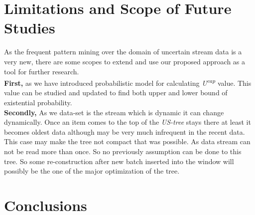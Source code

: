 \section{Limitations and Scope of Future Studies}
As the frequent pattern mining over the domain of uncertain stream data is a very new, there are some scopes to extend and use our proposed approach as a tool for further research.\\ 
\textbf{First,} as we have introduced probabilistic model for calculating \emph{U\textsuperscript{cap}} value. This value can be studied and updated to find both upper and lower bound of existential probability.\\
\textbf{Secondly,} As we data-set is the stream which is dynamic it can change dynamically. Once an item comes to the top of the \emph{US-tree} stays there at least it becomes oldest data although may be very much infrequent in the recent data. This case may make the tree not compact that was possible. As data stream can not be read more than once. So no previously assumption can be done to this tree. So some re-construction after new batch inserted into the window will possibly be the one of the major optimization of the tree.
\section{Conclusions}